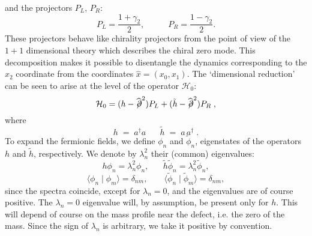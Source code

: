 \documentclass[a4paper,12pt]{article}
\begin{document}
{{\begin{equation}
\end{equation}
and the projectors $P_L$, $P_R$:
\begin{equation}\label{op3}
P_L = \frac{1 + \gamma_2}{2}, \;\;\;\;\;\;\;\;\;\; P_R = \frac{1 -
\gamma_2}{2}.
\end{equation}
These projectors behave like chirality projectors from the point of
view of the $1+1$ dimensional theory which describes the chiral zero
mode.  This decomposition makes it possible to disentangle the
dynamics corresponding to the $x_2$ coordinate from the coordinates
$\hat x = ( x_0 , x_1 )$.  The `dimensional reduction' can be seen to
arise at the level of the operator ${\mathcal H}_0$:
\begin{equation}
   \label{Hdea}
{\mathcal H}_0 =
(h - \widehat{\not\!\partial}^2) P_L + (\tilde{h} - \widehat{\not\!\partial}^2) P_R \;,
\end{equation}
where
\begin{equation}
h \;=\; a^{\dagger} a \;\;\;\;\;\; \tilde{h} \;=\; a\,a^{\dagger}\;.
\end{equation}
To expand the fermionic fields, we define $\phi_n$ and
$\widetilde{\phi}_n$, eigenstates of the operators $h$ and
$\tilde{h}$, respectively. We denote by $\lambda_n^2$ their (common)
eigenvalues:
\begin{equation}
h \phi_n = \lambda_n^2 \phi_n , \;\;\;\;\;\;
\tilde{h} \widetilde{\phi}_n = \lambda_n^2 \widetilde{\phi}_n ,
\end{equation}
\begin{equation}
\langle \phi_n \mid \phi_m \rangle = \delta_{nm}, \;\;\;\;\;\;\;
\langle \widetilde{\phi}_n \mid \widetilde{\phi}_m \rangle = \delta_{nm} ,
\end{equation}
since the spectra coincide, except for $\lambda_n = 0$, and the
eigenvalues are of course positive.  The $\lambda_n = 0$ eigenvalue
will, by assumption, be present only for $h$.  This will depend of
course on the mass profile near the defect, i.e. the zero of the mass.
Since the sign of $\lambda_n$ is arbitrary, we take it positive by
convention.

}}
\end{document}

